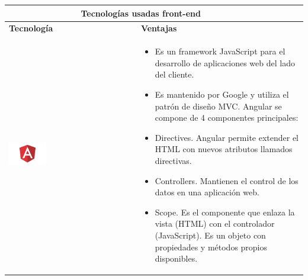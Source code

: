 \newpage
\begin{table}[b!]
	\centering
	\vspace{33mm}
	\begin{tabular}{|p{2cm}|ll}
		\hline
		\multicolumn{2}{|c|}{{\bf Tecnologías usadas front-end}} \\ 
		\hline
		\multicolumn{1}{|p{4cm}|}{{\bf Tecnología}}                                     &   
		\multicolumn{1}{p{10cm}|}{{\bf Ventajas}}\\
		\hline
		\multicolumn{1}{|p{5cm}|}{\includegraphics[width=0.3\textwidth]{images/angular}} &   
		\multicolumn{2}{p{10cm}|}{\begin{itemize}
		\vspace{-5mm}
		\item Es un framework JavaScript para el desarrollo de aplicaciones web del lado del cliente.
		\item Es mantenido por Google y utiliza el patrón de diseño MVC.
		Angular se compone de 4 componentes principales:
		\item Directives. Angular permite extender el HTML con nuevos
		atributos llamados directivas. 
		\item Controllers. Mantienen el control de los datos en una aplicación web. 
		\item Scope. Es el componente que enlaza la vista (HTML) con el controlador (JavaScript). Es un objeto con propiedades y métodos propios disponibles.
		\end{itemize}} \\
		        
		\hline
	\end{tabular}
	\label{table: tecnologias usadas}
\end{table}

